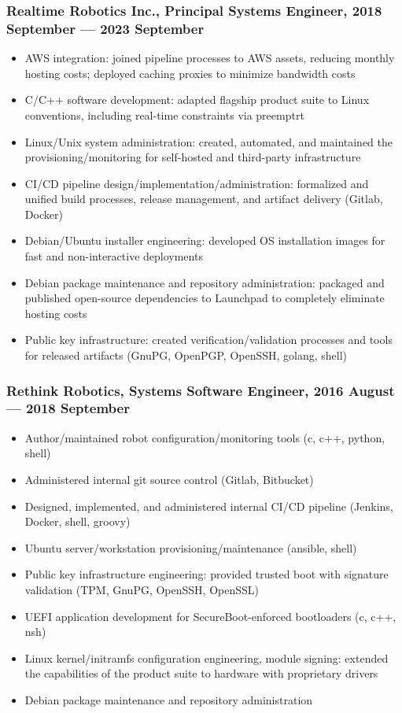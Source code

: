 \documentclass[letterpaper,11pt]{article}
\begin{document}
\subsubsection*{Realtime Robotics Inc., Principal Systems Engineer, 2018 September --- 2023 September}

\begin{itemize}
\item AWS integration: joined pipeline processes to AWS assets, reducing
  monthly hosting costs; deployed caching proxies to minimize bandwidth costs
\item C/C++ software development: adapted flagship product suite to Linux
  conventions, including real-time constraints via preemptrt
\item Linux/Unix system administration: created, automated, and maintained the
  provisioning/monitoring for self-hosted and third-party infrastructure
\item CI/CD pipeline design/implementation/administration: formalized and
  unified build processes, release management, and artifact delivery (Gitlab,
  Docker)
\item Debian/Ubuntu installer engineering: developed OS installation images for
  fast and non-interactive deployments
\item Debian package maintenance and repository administration: packaged and
  published open-source dependencies to Launchpad to completely eliminate
  hosting costs
\item Public key infrastructure: created verification/validation processes and
  tools for released artifacts (GnuPG, OpenPGP, OpenSSH, golang, shell)
\end{itemize}

\subsubsection*{Rethink Robotics, Systems Software Engineer, 2016 August --- 2018 September}

\begin{itemize}
\item Author/maintained robot configuration/monitoring tools (c, c++, python,
  shell)
\item Administered internal git source control (Gitlab, Bitbucket)
\item Designed, implemented, and administered internal CI/CD pipeline (Jenkins,
  Docker, shell, groovy)
\item Ubuntu server/workstation provisioning/maintenance (ansible, shell)
\item Public key infrastructure engineering: provided trusted boot with
  signature validation (TPM, GnuPG, OpenSSH, OpenSSL)
\item UEFI application development for SecureBoot-enforced bootloaders (c, c++,
  nsh)
\item Linux kernel/initramfs configuration engineering, module signing:
  extended the capabilities of the product suite to hardware with proprietary
  drivers
\item Debian package maintenance and repository administration
\end{itemize}
\end{document}
